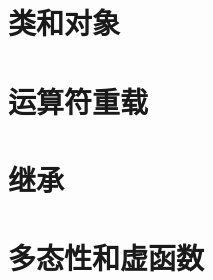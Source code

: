 \documentclass[cs4size,a4paper,nofonts]{ctexart}
\begin{document}

\part{类和对象}
 \clearpage
 \clearpage
 \clearpage


\part{运算符重载}
 \clearpage
 \clearpage


\part{继承}
 \clearpage


\part{多态性和虚函数}
 \clearpage
\end{document}
